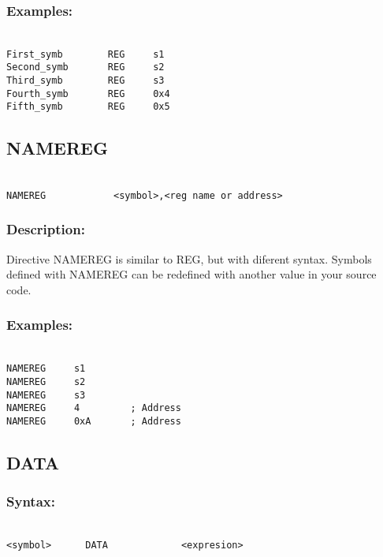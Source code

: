         \subsubsection{Examples:}
            {
            ~\\
            \usecodefont
            \verb'First_symb        REG     s1'\\
            \verb'Second_symb       REG     s2'\\
            \verb'Third_symb        REG     s3'\\
            \verb'Fourth_symb       REG     0x4'\\
            \verb'Fifth_symb        REG     0x5'\\
            }
            
        \subsection{NAMEREG}
        {
            ~\\
            \usecodefont        
            \verb'NAMEREG            <symbol>,<reg name or address> '
            }            
        \subsubsection{Description:}
        Directive NAMEREG is similar to REG, but with diferent syntax. Symbols defined with NAMEREG can be redefined with another value in your source
        code.

        \subsubsection{Examples:}
        {
            ~\\
            \usecodefont
            \verb'NAMEREG     s1'\\
            \verb'NAMEREG     s2'\\
            \verb'NAMEREG     s3'\\
            \verb'NAMEREG     4         ; Address'\\
            \verb'NAMEREG     0xA       ; Address'\\
        }


    \subsection{DATA}
        \subsubsection{Syntax:}
            {
                ~\\
                \usecodefont        
            \verb'<symbol>      DATA             <expresion>'
            }            
            
